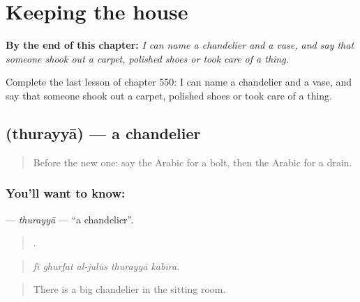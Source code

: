 
\chapter{Keeping the house}
\label{ch:ar-keeping-the-house}

\begin{chapteropening}
\textbf{By the end of this chapter:} \emph{I can name a chandelier and a vase, and say that someone shook out a carpet, polished shoes or took care of a thing.}

Complete the last lesson of chapter 550: I can name a chandelier and a vase, and say that someone shook out a carpet, polished shoes or took care of a thing.
\end{chapteropening}

\section[\texorpdfstring{\ar{ثريا} (thurayyā)}{ثريا (thurayyā)}]{ (thurayyā) — a chandelier}

\label{lesson:AR-C550-thurayya}



\begin{quote}
Before the new one: say the Arabic for a bolt, then the Arabic for a drain.
\end{quote}

\subsection*{You'll want to know: }
\textbf{} — \emph{thurayyā} — \textquotedblleft{}a chandelier\textquotedblright{}.

\begin{quote}
    .
\end{quote}

\begin{quote}
\emph{fī ghurfat al-julūs thurayyā kabīra.}
\end{quote}

\begin{quote}
There is a big chandelier in the sitting room.
\end{quote}

